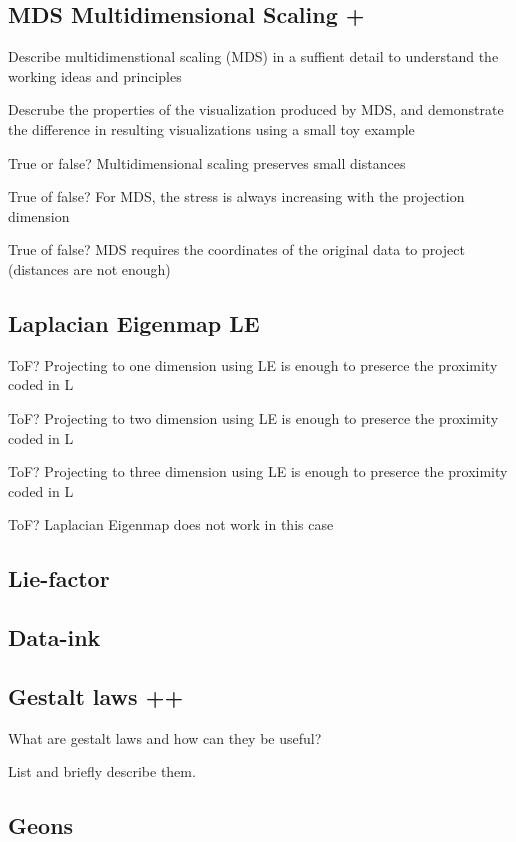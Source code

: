 \documentclass[a4paper]{article}
\begin{document}
\subsection{MDS Multidimensional Scaling +}

Describe multidimenstional scaling (MDS) in a suffient detail to understand the working ideas and principles

Descrube the properties of the visualization produced by MDS, and demonstrate the difference in resulting visualizations using a small toy example

True or false? Multidimensional scaling preserves small distances

True of false? For MDS, the stress is always increasing with the projection dimension

True of false? MDS requires the coordinates of the original data to project (distances are not enough)

\subsection{Laplacian Eigenmap LE}

ToF? Projecting to one dimension using LE is enough to preserce the proximity coded in L

ToF? Projecting to two dimension using LE is enough to preserce the proximity coded in L

ToF? Projecting to three dimension using LE is enough to preserce the proximity coded in L

ToF? Laplacian Eigenmap does not work in this case

\subsection{Lie-factor}

\subsection{Data-ink}

\subsection{Gestalt laws ++}

What are gestalt laws and how can they be useful?

List and briefly describe them.

\subsection{Geons}
\end{document}
